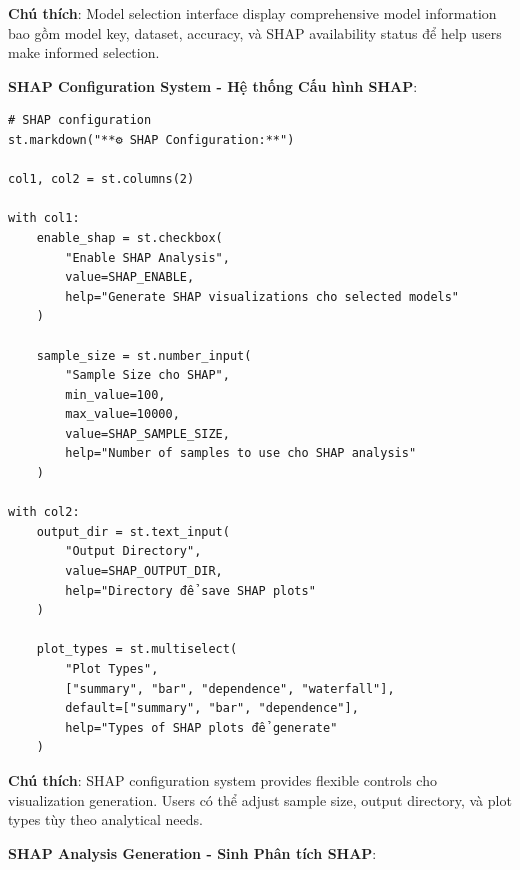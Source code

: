 \textbf{Chú thích}: Model selection interface display comprehensive model information bao gồm model key, dataset, accuracy, và SHAP availability status để help users make informed selection.

\textbf{SHAP Configuration System - Hệ thống Cấu hình SHAP}:

\begin{verbatim}
# SHAP configuration
st.markdown("**⚙️ SHAP Configuration:**")

col1, col2 = st.columns(2)

with col1:
    enable_shap = st.checkbox(
        "Enable SHAP Analysis",
        value=SHAP_ENABLE,
        help="Generate SHAP visualizations cho selected models"
    )
    
    sample_size = st.number_input(
        "Sample Size cho SHAP",
        min_value=100,
        max_value=10000,
        value=SHAP_SAMPLE_SIZE,
        help="Number of samples to use cho SHAP analysis"
    )

with col2:
    output_dir = st.text_input(
        "Output Directory",
        value=SHAP_OUTPUT_DIR,
        help="Directory để save SHAP plots"
    )
    
    plot_types = st.multiselect(
        "Plot Types",
        ["summary", "bar", "dependence", "waterfall"],
        default=["summary", "bar", "dependence"],
        help="Types of SHAP plots để generate"
    )
\end{verbatim}

\textbf{Chú thích}: SHAP configuration system provides flexible controls cho visualization generation. Users có thể adjust sample size, output directory, và plot types tùy theo analytical needs.

\textbf{SHAP Analysis Generation - Sinh Phân tích SHAP}:


